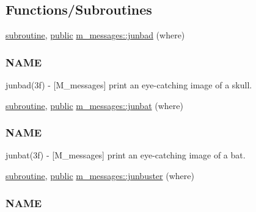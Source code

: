 \subsection*{Functions/\+Subroutines}
\begin{DoxyCompactItemize}
\item 
\hyperlink{M__stopwatch_83_8txt_acfbcff50169d691ff02d4a123ed70482}{subroutine}, \hyperlink{M__stopwatch_83_8txt_a2f74811300c361e53b430611a7d1769f}{public} \hyperlink{namespacem__messages_acad2630aef5050e3cfda550f22141f3c}{m\+\_\+messages\+::junbad} (where)
\begin{DoxyCompactList}\small\item\em \subsubsection*{N\+A\+ME}

junbad(3f) -\/ \mbox{[}M\+\_\+messages\mbox{]} print an eye-\/catching image of a skull. \end{DoxyCompactList}\item 
\hyperlink{M__stopwatch_83_8txt_acfbcff50169d691ff02d4a123ed70482}{subroutine}, \hyperlink{M__stopwatch_83_8txt_a2f74811300c361e53b430611a7d1769f}{public} \hyperlink{namespacem__messages_aa7fb6e6a0f67d0456ac5aee78d81213d}{m\+\_\+messages\+::junbat} (where)
\begin{DoxyCompactList}\small\item\em \subsubsection*{N\+A\+ME}

junbat(3f) -\/ \mbox{[}M\+\_\+messages\mbox{]} print an eye-\/catching image of a bat. \end{DoxyCompactList}\item 
\hyperlink{M__stopwatch_83_8txt_acfbcff50169d691ff02d4a123ed70482}{subroutine}, \hyperlink{M__stopwatch_83_8txt_a2f74811300c361e53b430611a7d1769f}{public} \hyperlink{namespacem__messages_a8d5bfbeee271ab7e419dc9960caf5221}{m\+\_\+messages\+::junbuster} (where)
\begin{DoxyCompactList}\small\item\em \subsubsection*{N\+A\+ME}


\end{DoxyCompactList}
\end{DoxyCompactItemize}

